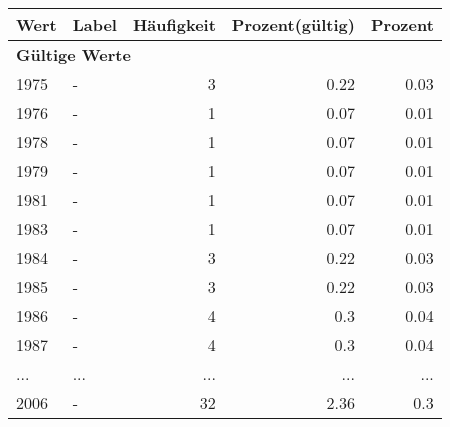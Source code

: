      \begin{longtable}{lXrrr}
     \toprule
     \textbf{Wert} & \textbf{Label} & \textbf{Häufigkeit} & \textbf{Prozent(gültig)} & \textbf{Prozent} \\
     \endhead
     \midrule
     \multicolumn{5}{l}{\textbf{Gültige Werte}}\\
        1975 & \multicolumn{1}{X}{-} & %
          \num{3} &
          \num[round-mode=places,round-precision=2]{0,22} &
          \num[round-mode=places,round-precision=2]{0,03} \\
        1976 & \multicolumn{1}{X}{-} & %
          \num{1} &
          \num[round-mode=places,round-precision=2]{0,07} &
          \num[round-mode=places,round-precision=2]{0,01} \\
        1978 & \multicolumn{1}{X}{-} & %
          \num{1} &
          \num[round-mode=places,round-precision=2]{0,07} &
          \num[round-mode=places,round-precision=2]{0,01} \\
        1979 & \multicolumn{1}{X}{-} & %
          \num{1} &
          \num[round-mode=places,round-precision=2]{0,07} &
          \num[round-mode=places,round-precision=2]{0,01} \\
        1981 & \multicolumn{1}{X}{-} & %
          \num{1} &
          \num[round-mode=places,round-precision=2]{0,07} &
          \num[round-mode=places,round-precision=2]{0,01} \\
        1983 & \multicolumn{1}{X}{-} & %
          \num{1} &
          \num[round-mode=places,round-precision=2]{0,07} &
          \num[round-mode=places,round-precision=2]{0,01} \\
        1984 & \multicolumn{1}{X}{-} & %
          \num{3} &
          \num[round-mode=places,round-precision=2]{0,22} &
          \num[round-mode=places,round-precision=2]{0,03} \\
        1985 & \multicolumn{1}{X}{-} & %
          \num{3} &
          \num[round-mode=places,round-precision=2]{0,22} &
          \num[round-mode=places,round-precision=2]{0,03} \\
        1986 & \multicolumn{1}{X}{-} & %
          \num{4} &
          \num[round-mode=places,round-precision=2]{0,3} &
          \num[round-mode=places,round-precision=2]{0,04} \\
        1987 & \multicolumn{1}{X}{-} & %
          \num{4} &
          \num[round-mode=places,round-precision=2]{0,3} &
          \num[round-mode=places,round-precision=2]{0,04} \\
       ... & ... & ... & ... & ... \\
        2006 & \multicolumn{1}{X}{-} & %
          \num{32} &
          \num[round-mode=places,round-precision=2]{2,36} &
          \num[round-mode=places,round-precision=2]{0,3} \\


\end{longtable}
